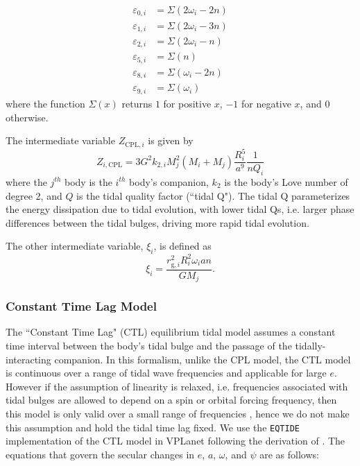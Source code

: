 \documentclass[twocolumn]{aastex61}
\newcommand{\eqtide}[0]{\texttt{EQTIDE}\xspace}
\begin{document}
\begin{equation} \label{eqn:cpl:eps}
\begin{split}
\varepsilon_{0,i} & = \Sigma(2 \omega_i - 2n) \\
\varepsilon_{1,i} & = \Sigma(2 \omega_i - 3n) \\
\varepsilon_{2,i} & = \Sigma(2 \omega_i - n) \\
\varepsilon_{5,i} & = \Sigma(n) \\
\varepsilon_{8,i} & = \Sigma(\omega_i - 2n) \\
\varepsilon_{9,i} & = \Sigma(\omega_i)
\end{split}
\end{equation}
where the function $\Sigma(x)$ returns $1$ for positive $x$, $-1$ for negative $x$, and $0$ otherwise.

The intermediate variable $Z_{\mathrm{CPL},i}$ is given by
\begin{equation} \label{eqn:cpl:z}
Z_{i,\mathrm{CPL}} = 3 G^2 k_{2,i} M_j^2 (M_i + M_j) \frac{R_i^5}{a^9} \frac{1}{n Q_i}
\end{equation}
where the $j^{th}$ body is the $i^{th}$ body's companion, $k_{2}$ is the body's Love number of degree 2, and $Q$ is the tidal quality factor (``tidal Q"). The tidal Q parameterizes the energy dissipation due to tidal evolution, with lower tidal Qs, i.e. larger phase differences between the tidal bulges, driving more rapid tidal evolution.

The other intermediate variable, $\xi_i$, is defined as
\begin{equation}\label{eqn:cpl:chi}
\xi_i = \frac{r_{\mathrm{g},i}^2 R_i^2 \omega_i a n }{ G M_j}.
\end{equation}

\subsubsection{Constant Time Lag Model}

The ``Constant Time Lag" (CTL) \citep[][]{Hut1981,Leconte2010} equilibrium tidal model assumes a constant time interval between the body's tidal bulge and the passage of the tidally-interacting companion. In this formalism, unlike the CPL model, the CTL model is continuous over a range of tidal wave frequencies and applicable for large $e$.  However if the assumption of linearity is relaxed, i.e. frequencies associated with tidal bulges are allowed to depend on a spin or orbital forcing frequency, then this model is only valid over a small range of frequencies \citep{Greenberg2009}, hence we do not make this assumption and hold the tidal time lag fixed. We use the \eqtide implementation of the CTL model in VPLanet following the derivation of \citet{Leconte2010}.  The equations that govern the secular changes in $e$, $a$, $\omega$, and $\psi$ are as follows:
\end{document}
